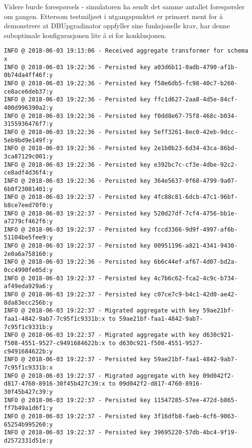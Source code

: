 Videre burde forespørsels - simulatoren ha sendt det samme antallet forespørsler om gangen. Ettersom testmiljøet i utgangspunktet er primært ment for å demonstrere at DBUpgradinator oppfyller sine funksjonelle krav, har denne suboptimale konfigurasjonen lite å si for konklusjonen.

\begin{lstlisting}[basicstyle=\footnotesize, label={testlog}, caption={De første 50 linjene i den applikasjonsloggen til tjeneren ''vbb-master2018-crabbe''' (se tabell \ref{droplets}) fra test 2.}]
INFO @ 2018-06-03 19:13:06 - Received aggregate transformer for schema x
INFO @ 2018-06-03 19:22:36 - Persisted key a03d6b11-0adb-4790-af1b-0b74da4ff46f:y
INFO @ 2018-06-03 19:22:36 - Persisted key f58e6db5-fc98-40c7-b260-ce8ace6deb37:y
INFO @ 2018-06-03 19:22:36 - Persisted key ffc1d627-2aa8-4d5e-84cf-400d996390a2:y
INFO @ 2018-06-03 19:22:36 - Persisted key f0dd8e67-75f8-468c-b034-3155936476f7:y
INFO @ 2018-06-03 19:22:36 - Persisted key 5eff3261-8ec0-42eb-9dcc-5eb9bd9e149f:y
INFO @ 2018-06-03 19:22:36 - Persisted key 2e1b0b23-6d34-43ca-86bd-3ca87129c001:y
INFO @ 2018-06-03 19:22:36 - Persisted key e392bc7c-cf3e-4dbe-92c2-ce8adf4d36f4:y
INFO @ 2018-06-03 19:22:36 - Persisted key 364e5637-0f68-4799-9a07-6b0f23081401:y
INFO @ 2018-06-03 19:22:37 - Persisted key 4fc88c81-6dcb-47c1-96bf-b8ce7eed70f0:y
INFO @ 2018-06-03 19:22:37 - Persisted key 520d27df-7cf4-4756-bb1e-a7279cf462f6:y
INFO @ 2018-06-03 19:22:37 - Persisted key fccd3366-9d9f-4997-af6b-51104be5fee9:y
INFO @ 2018-06-03 19:22:37 - Persisted key 00951196-a821-4341-9430-2e0a6a758160:y
INFO @ 2018-06-03 19:22:36 - Persisted key 6b6c44ef-af67-4d07-bd2a-0cc4990fe05d:y
INFO @ 2018-06-03 19:22:37 - Persisted key 4c7b6c62-fca2-4c9c-b734-af49eda929a6:y
INFO @ 2018-06-03 19:22:37 - Persisted key c07ce7c9-b4c1-42d0-ae42-8da83ecc256b:y
INFO @ 2018-06-03 19:22:37 - Migrated aggregate with key 59ae21bf-faa1-4842-9ab7-7c95f1c9331b:x to 59ae21bf-faa1-4842-9ab7-7c95f1c9331b:y
INFO @ 2018-06-03 19:22:37 - Migrated aggregate with key d630c921-f508-4551-9527-c9491684622b:x to d630c921-f508-4551-9527-c9491684622b:y
INFO @ 2018-06-03 19:22:37 - Persisted key 59ae21bf-faa1-4842-9ab7-7c95f1c9331b:x
INFO @ 2018-06-03 19:22:37 - Migrated aggregate with key 09d042f2-d817-4760-8916-30f45b427c39:x to 09d042f2-d817-4760-8916-30f45b427c39:y
INFO @ 2018-06-03 19:22:37 - Persisted key 11547285-57ee-472d-b865-ff7b49a1d6f1:y
INFO @ 2018-06-03 19:22:37 - Persisted key 3f16dfb8-faeb-4cf6-9063-65254b995260:y
INFO @ 2018-06-03 19:22:37 - Persisted key 39695220-57db-4bc4-9f19-d2572331d51e:y

\end{lstlisting}

